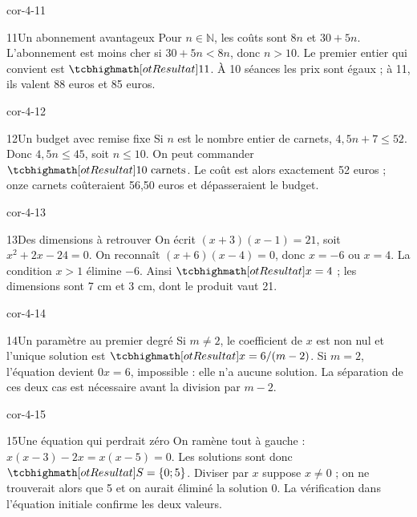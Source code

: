 \begin{blocLivre}{cor-4-11}
\begin{corrige}{11}{Un abonnement avantageux}
Pour $n\in\mathbb N$, les coûts sont $8n$ et $30+5n$. L’abonnement est moins cher si $30+5n<8n$, donc $n>10$. Le premier entier qui convient est $\res{11}$. À 10 séances les prix sont égaux ; à 11, ils valent 88 euros et 85 euros.
\end{corrige}
\end{blocLivre}
\begin{blocLivre}{cor-4-12}
\begin{corrige}{12}{Un budget avec remise fixe}
Si $n$ est le nombre entier de carnets, $4{,}5n+7\le52$. Donc $4{,}5n\le45$, soit $n\le10$. On peut commander $\res{10\text{ carnets}}$. Le coût est alors exactement 52 euros ; onze carnets coûteraient 56,50 euros et dépasseraient le budget.
\end{corrige}
\end{blocLivre}
\begin{blocLivre}{cor-4-13}
\begin{corrige}{13}{Des dimensions à retrouver}
On écrit $(x+3)(x-1)=21$, soit $x^2+2x-24=0$. On reconnaît $(x+6)(x-4)=0$, donc $x=-6$ ou $x=4$. La condition $x>1$ élimine $-6$. Ainsi $\res{x=4}$ ; les dimensions sont 7 cm et 3 cm, dont le produit vaut 21.
\label{fig-cor-4-13}
\end{corrige}
\end{blocLivre}
\begin{blocLivre}{cor-4-14}
\begin{corrige}{14}{Un paramètre au premier degré}
Si $m\ne2$, le coefficient de $x$ est non nul et l’unique solution est $\res{x=6/(m-2)}$. Si $m=2$, l’équation devient $0x=6$, impossible : elle n’a aucune solution. La séparation de ces deux cas est nécessaire avant la division par $m-2$.
\end{corrige}
\end{blocLivre}
\begin{blocLivre}{cor-4-15}
\begin{corrige}{15}{Une équation qui perdrait zéro}
On ramène tout à gauche : $x(x-3)-2x=x(x-5)=0$. Les solutions sont donc $\res{S=\{0;5\}}$. Diviser par $x$ suppose $x\ne0$ ; on ne trouverait alors que 5 et on aurait éliminé la solution 0. La vérification dans l’équation initiale confirme les deux valeurs.
\end{corrige}
\end{blocLivre}
